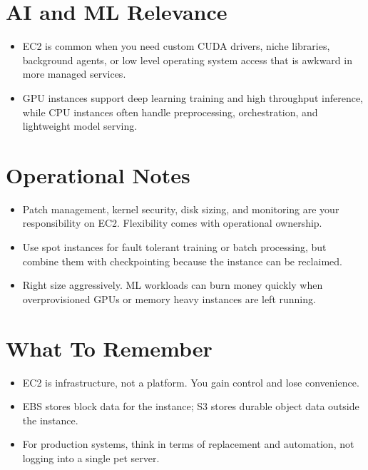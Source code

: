 \documentclass[10pt,twocolumn]{article}
\begin{document}
\section*{AI and ML Relevance}
\begin{itemize}
\item EC2 is common when you need custom CUDA drivers, niche libraries, background agents, or low level operating system access that is awkward in more managed services.
\item GPU instances support deep learning training and high throughput inference, while CPU instances often handle preprocessing, orchestration, and lightweight model serving.
\end{itemize}

\section*{Operational Notes}
\begin{itemize}
\item Patch management, kernel security, disk sizing, and monitoring are your responsibility on EC2. Flexibility comes with operational ownership.
\item Use spot instances for fault tolerant training or batch processing, but combine them with checkpointing because the instance can be reclaimed.
\item Right size aggressively. ML workloads can burn money quickly when overprovisioned GPUs or memory heavy instances are left running.
\end{itemize}

\section*{What To Remember}
\begin{itemize}
\item EC2 is infrastructure, not a platform. You gain control and lose convenience.
\item EBS stores block data for the instance; S3 stores durable object data outside the instance.
\item For production systems, think in terms of replacement and automation, not logging into a single pet server.
\end{itemize}
\end{document}
